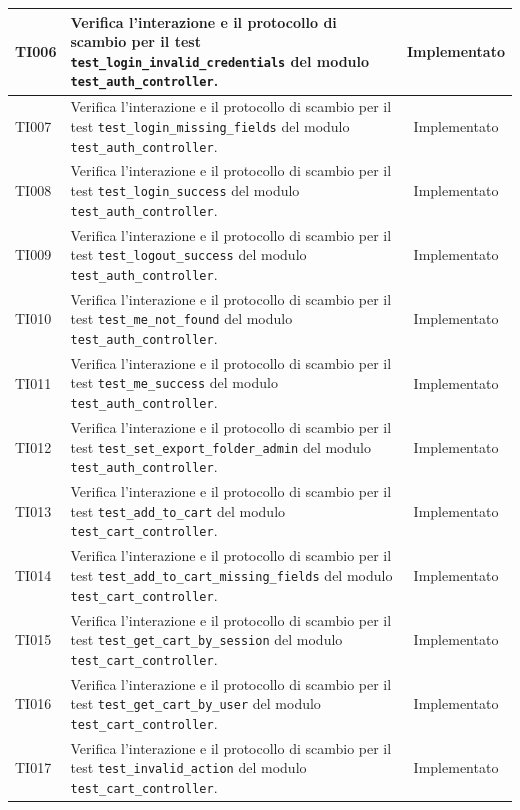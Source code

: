 \documentclass[a4paper,11pt,oneside]{scrartcl}
\begin{document}
\begin{longtable}{|p{1.9cm}|p{11.6cm}|c|}
    TI006 & Verifica l'interazione e il protocollo di scambio per il test \texttt{test\_login\_invalid\_credentials} del modulo \texttt{test\_auth\_controller}. & Implementato \\ \hline
    TI007 & Verifica l'interazione e il protocollo di scambio per il test \texttt{test\_login\_missing\_fields} del modulo \texttt{test\_auth\_controller}. & Implementato \\ \hline
    TI008 & Verifica l'interazione e il protocollo di scambio per il test \texttt{test\_login\_success} del modulo \texttt{test\_auth\_controller}. & Implementato \\ \hline
    TI009 & Verifica l'interazione e il protocollo di scambio per il test \texttt{test\_logout\_success} del modulo \texttt{test\_auth\_controller}. & Implementato \\ \hline
    TI010 & Verifica l'interazione e il protocollo di scambio per il test \texttt{test\_me\_not\_found} del modulo \texttt{test\_auth\_controller}. & Implementato \\ \hline
    TI011 & Verifica l'interazione e il protocollo di scambio per il test \texttt{test\_me\_success} del modulo \texttt{test\_auth\_controller}. & Implementato \\ \hline
    TI012 & Verifica l'interazione e il protocollo di scambio per il test \texttt{test\_set\_export\_folder\_admin} del modulo \texttt{test\_auth\_controller}. & Implementato \\ \hline
    TI013 & Verifica l'interazione e il protocollo di scambio per il test \texttt{test\_add\_to\_cart} del modulo \texttt{test\_cart\_controller}. & Implementato \\ \hline
    TI014 & Verifica l'interazione e il protocollo di scambio per il test \texttt{test\_add\_to\_cart\_missing\_fields} del modulo \texttt{test\_cart\_controller}. & Implementato \\ \hline
    TI015 & Verifica l'interazione e il protocollo di scambio per il test \texttt{test\_get\_cart\_by\_session} del modulo \texttt{test\_cart\_controller}. & Implementato \\ \hline
    TI016 & Verifica l'interazione e il protocollo di scambio per il test \texttt{test\_get\_cart\_by\_user} del modulo \texttt{test\_cart\_controller}. & Implementato \\ \hline
    TI017 & Verifica l'interazione e il protocollo di scambio per il test \texttt{test\_invalid\_action} del modulo \texttt{test\_cart\_controller}. & Implementato \\ \hline

\end{longtable}
\end{document}
